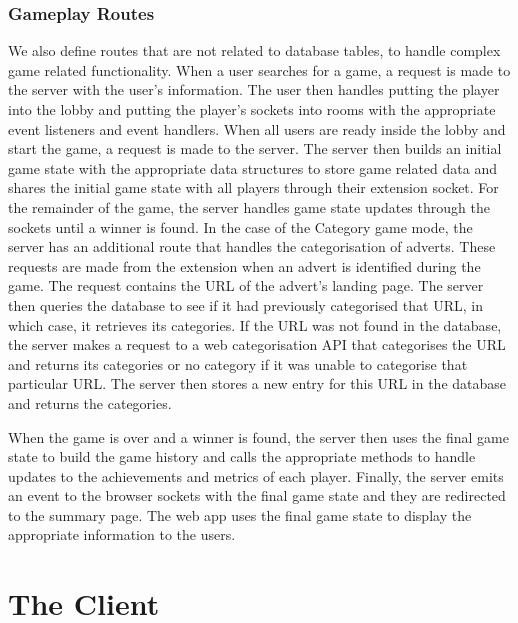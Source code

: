 \documentclass{l4proj}
\begin{document}
\subsubsection{Gameplay Routes}
We also define routes that are not related to database tables, to handle complex game related functionality. When a user searches for a game, a request is made to the server with the user's information. The user then handles putting the player into the lobby and putting the player's sockets into rooms with the appropriate event listeners and event handlers. When all users are ready inside the lobby and start the game, a request is made to the server. The server then builds an initial game state with the appropriate data structures to store game related data and shares the initial game state with all players through their extension socket. For the remainder of the game, the server handles game state updates through the sockets until a winner is found. In the case of the Category game mode, the server has an additional route that handles the categorisation of adverts. These requests are made from the extension when an advert is identified during the game. The request contains the URL of the advert's landing page. The server then queries the database to see if it had previously categorised that URL, in which case, it retrieves its categories. If the URL was not found in the database, the server makes a request to a web categorisation API that categorises the URL and returns its categories or no category if it was unable to categorise that particular URL. The server then stores a new entry for this URL in the database and returns the categories.

When the game is over and a winner is found, the server then uses the final game state to build the game history and calls the appropriate methods to handle updates to the achievements and metrics of each player. Finally, the server emits an event to the browser sockets with the final game state and they are redirected to the summary page. The web app uses the final game state to display the appropriate information to the users.    

\section{The Client}
\end{document}
